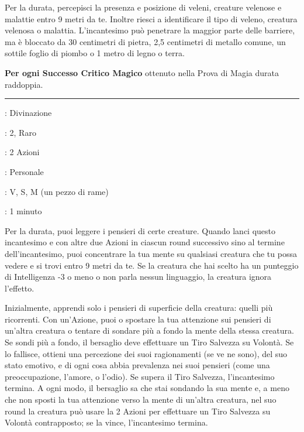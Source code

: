 \begin{multicols}{2}
Per la durata, percepisci la presenza e posizione di veleni, creature velenose e malattie entro 9 metri da te. Inoltre riesci a identificare il tipo di veleno, creatura velenosa o malattia. L'incantesimo può penetrare la maggior parte delle barriere, ma è bloccato da 30 centimetri di pietra, 2,5 centimetri di metallo comune, un sottile foglio di piombo o 1 metro di legno o terra.

\textbf{Per ogni Successo Critico Magico} ottenuto nella Prova di Magia durata raddoppia.

\smallskip\noindent\rule{\linewidth}{2pt} \hypertarget{Individuazione dei Pensieri}{}\medskip{}
\noindent
\begin{description}[noitemsep, topsep=0pt, parsep=0pt, partopsep=0pt, leftmargin=0cm, labelwidth=2.8cm]
	\item[\textbf{Lista di Magia}]: Divinazione
	\item[\textbf{Livello}]: 2, Raro
	\item[\textbf{T. di Lancio}]: 2 Azioni
	\item[\textbf{Gittata}]: Personale
	\item[\textbf{Componenti}]: V, S, M (un pezzo di rame)
	\item[\textbf{Durata}]: 1 minuto
\end{description}

Per la durata, puoi leggere i pensieri di certe creature. Quando lanci questo incantesimo e con altre due Azioni in ciascun round successivo sino al termine dell'incantesimo, puoi concentrare la tua mente su qualsiasi creatura che tu possa vedere e si trovi entro 9 metri da te. Se la creatura che hai scelto ha un punteggio di Intelligenza -3 o meno o non parla nessun linguaggio, la creatura ignora l'effetto.

Inizialmente, apprendi solo i pensieri di superficie della creatura: quelli più ricorrenti. Con un'Azione, puoi o spostare la tua attenzione sui pensieri di un'altra creatura o tentare di sondare più a fondo la mente della stessa creatura. Se sondi più a fondo, il bersaglio deve effettuare un Tiro Salvezza su Volontà. Se lo fallisce, ottieni una percezione dei suoi ragionamenti (se ve ne sono), del suo stato emotivo, e di ogni cosa abbia prevalenza nei suoi pensieri (come una preoccupazione, l'amore, o l'odio). Se supera il Tiro Salvezza, l'incantesimo termina. A ogni modo, il bersaglio sa che stai sondando la sua mente e, a meno che non sposti la tua attenzione verso la mente di un'altra creatura, nel suo round la creatura può usare la 2 Azioni per effettuare un Tiro Salvezza su Volontà contrapposto; se la vince, l'incantesimo termina.


\end{multicols}
